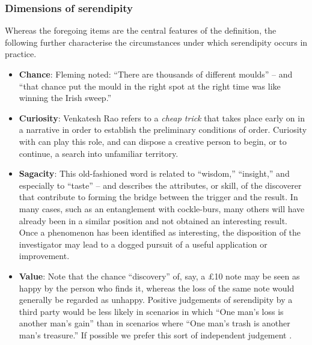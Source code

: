 \subsubsection*{Dimensions of serendipity}

Whereas the foregoing items are the central features of the
definition, the following further characterise the circumstances under
which serendipity occurs in practice.

\begin{itemize}
\item \textbf{Chance}: Fleming \citeyear{fleming} noted: ``There are
  thousands of different moulds'' -- and ``that chance put the mould
  in the right spot at the right time was like winning the Irish
  sweep.''
%
\item \textbf{Curiosity}: Venkatesh Rao \citeyear{rao2011tempo} refers
  to a \emph{cheap trick} that takes place early on in a narrative in
  order to establish the preliminary conditions of order.  Curiosity
  with can play this role, and can dispose a creative person to begin,
  or to continue, a search into unfamiliar territory.
%
\item \textbf{Sagacity}: This old-fashioned word is related to
  ``wisdom,'' ``insight,'' and especially to ``taste'' -- and
  describes the attributes, or skill, of the discoverer that
  contribute to forming the bridge between the trigger and the result.
  In many cases, such as an entanglement with cockle-burs, many others
  will have already been in a similar position and not obtained an
  interesting result.  Once a phenomenon has been identified as
  interesting, the disposition of the investigator may lead to a
  dogged pursuit of a useful application or improvement.
%
\item \textbf{Value}: Note that the chance ``discovery'' of, say, a
  \pounds 10 note may be seen as happy by the person who finds it,
  whereas the loss of the same note would generally be regarded as
  unhappy.  Positive judgements of serendipity by a third party would
  be less likely in scenarios in which ``One man's loss is another
  man's gain'' than in scenarios where ``One man's trash is another
  man's treasure.''  If possible we prefer this sort of independent
  judgement \cite{jordanous:12}.
%
\end{itemize}

